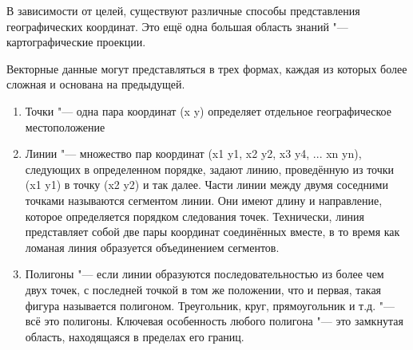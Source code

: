 В зависимости от целей, существуют различные способы представления
географических координат. Это ещё одна большая область знаний "---
картографические проекции.

Векторные данные могут представляться в трех формах, каждая из которых
более сложная и основана на предыдущей.

\begin{enumerate}
\item Точки "--- одна пара координат (x y) определяет отдельное
географическое местоположение
\item Линии "--- множество пар координат (x1 y1, x2 y2, x3 y4, ... xn yn),
следующих в определенном порядке, задают линию, проведённую из точки
(x1 y1) в точку (x2 y2) и так далее. Части линии между двумя соседними точками
называются сегментом линии. Они имеют длину и направление, которое
определяется порядком следования точек. Технически, линия представляет
собой две пары координат соединённых вместе, в то время как ломаная
линия образуется объединением сегментов.
\item Полигоны "--- если линии образуются последовательностью из более
чем двух точек, с последней точкой в том же положении, что и первая,
такая фигура называется полигоном. Треугольник, круг, прямоугольник и т.д. "---
всё это полигоны. Ключевая особенность любого полигона "--- это замкнутая область,
находящаяся в пределах его границ.
\end{enumerate}
